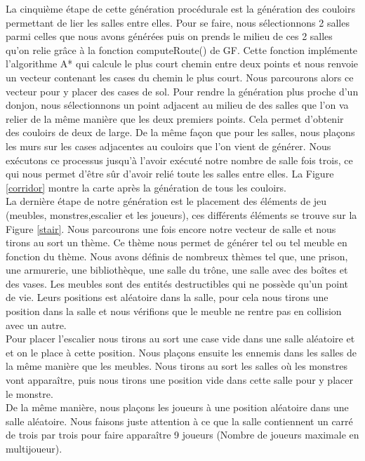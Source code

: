 \documentclass[a4paper, 12pt]{article}
\begin{document}
La cinquième étape de cette génération procédurale est la génération des couloirs permettant de lier les salles entre elles. Pour se faire, nous sélectionnons 2 salles parmi celles que nous avons générées puis on prends le milieu de ces 2 salles qu'on relie grâce à la fonction computeRoute() de GF. Cette fonction implémente l'algorithme A* qui calcule le plus court chemin entre deux points et nous renvoie un vecteur contenant les cases du chemin le plus court. Nous parcourons alors ce vecteur pour y placer des cases de sol. Pour rendre la génération plus proche d'un donjon, nous sélectionnons un point adjacent au milieu de des salles que l'on va relier de la même manière que les deux premiers points. Cela permet d'obtenir des couloirs de deux de large. De la même façon que pour les salles, nous plaçons les murs sur les cases adjacentes au couloirs que l'on vient de générer. Nous exécutons ce processus jusqu'à l'avoir exécuté notre nombre de salle fois trois, ce qui nous permet d'être sûr d'avoir relié toute les salles entre elles. La Figure \ref{corridor} montre la carte après la génération de tous les couloirs. \\

La dernière étape de notre génération est le placement des éléments de jeu (meubles, monstres,escalier et les joueurs), ces différents éléments se trouve sur la Figure \ref{stair}. Nous parcourons une fois encore notre vecteur de salle et nous tirons au sort un thème. Ce thème nous permet de générer tel ou tel meuble en fonction du thème. Nous avons définis de nombreux thèmes tel que, une prison, une armurerie, une bibliothèque, une salle du trône, une salle avec des boîtes et des vases. Les meubles sont des entités destructibles qui ne possède qu'un point de vie. Leurs positions est aléatoire dans la salle, pour cela nous tirons une position dans la salle et nous vérifions que le meuble ne rentre pas en collision avec un autre. \\
Pour placer l'escalier nous tirons au sort une case vide dans une salle aléatoire et et on le place à cette position.
Nous plaçons ensuite les ennemis dans les salles de la même manière que les meubles. Nous tirons au sort les salles où les monstres vont apparaître, puis nous tirons une position vide dans cette salle pour y placer le monstre. \\
De la même manière, nous plaçons les joueurs à une position aléatoire dans une salle aléatoire. Nous faisons juste attention à ce que la salle contiennent un carré de trois par trois pour faire apparaître 9 joueurs (Nombre de joueurs maximale en multijoueur).
\newpage
\end{document}
